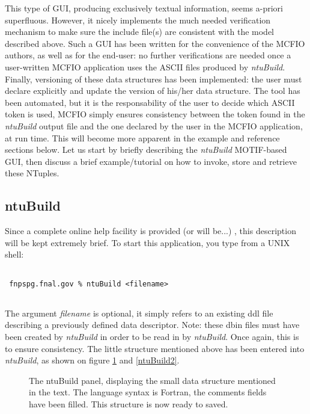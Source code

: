 This type of GUI, producing exclusively  textual information,  seems a-priori
superfluous. However, it nicely implements the much needed verification
mechanism to make sure the include file(s) are consistent with the model
described above.  Such a GUI has been written  for the convenience of the MCFIO
authors, as well as for the end-user: no further verifications are needed once a
user-written MCFIO application uses the ASCII files produced by {\em
ntuBuild}. Finally, versioning of these data structures has been implemented:
the user must declare explicitly and update the version of his/her data 
structure. The tool has been automated, but it is the responsability of the
user to decide which ASCII token is used, MCFIO simply ensures consistency
between the token found in the {\em ntuBuild} output file and the one declared
by the user in the MCFIO application, at run time.  This
will become more apparent in the example and reference  sections below.  Let us
start by briefly describing the {\em ntuBuild} MOTIF-based GUI, then discuss a
brief example/tutorial on how to invoke, store and retrieve these NTuples. 

\subsection{ntuBuild}

Since a complete online help facility is provided (or will be...) , this description will be kept
extremely brief.  To start this application, you  type  from a UNIX shell:
\begin{verbatim}
     
 fnpspg.fnal.gov % ntuBuild <filename>
 
\end{verbatim}

	The argument {\em filename} is optional, it simply refers to an 
existing ddl file describing a previously defined data descriptor. Note:
these dbin files must have been created by {\em ntuBuild} in order to be read
 in by {\em ntuBuild}.  Once again, this is to ensure consistency.  The little 
 structure mentioned above has been entered into {\em ntuBuild}, as shown 
 on figure \ref{ntuBuild1} and \ref{ntuBuild2}.
   
\begin{figure} 
\begin{center}
\leavevmode
\epsfysize=300pt
\caption{The ntuBuild panel, displaying the small data structure mentioned 
in the text. The language syntax is Fortran, the comments fields have been 
filled.  This structure is now ready to saved.}
\label{ntuBuild1}
\end{center} 
\end{figure}
   
